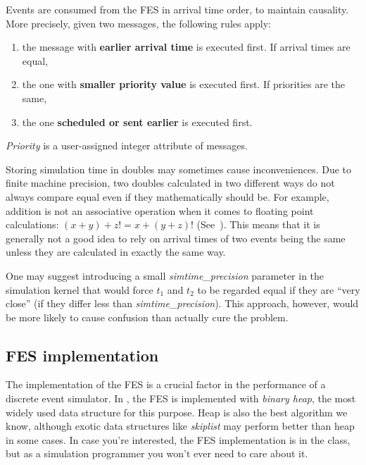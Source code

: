 Events are consumed from the FES in arrival time order, to
maintain causality. More precisely, given two messages, the following
rules apply:
\begin{enumerate}
\item{the message with \textbf{earlier arrival time} is executed
    first.  If arrival times are equal,}
\item{the one with \textbf{smaller priority value} is executed first.
    If priorities are the same,}
\item{the one \textbf{scheduled or sent earlier} is executed first.}
\end{enumerate}

\textit{Priority} is a user-assigned integer
attribute of messages.

Storing simulation time in doubles may sometimes cause inconveniences.
Due to finite machine precision, two doubles calculated in two
different ways do not always compare equal even if they mathematically
should be. For example, addition is not an associative operation
when it comes to floating point calculations: $(x+y)+z != x+(y+z)$!
(See~\cite{Goldberg91what}).
This means that it is generally not a good idea to rely on
arrival times of two events being the same unless they are
calculated in exactly the same way.

One may suggest introducing a small \textit{simtime\_precision} parameter in
the simulation kernel that would force $t_{1}$ and $t_{2}$ to be regarded
equal if they are ``very close'' (if they differ
less than \textit{simtime\_precision}). This approach, however, would
be more likely to cause confusion than actually cure the problem.



\subsection{FES implementation}

The implementation of the FES is a crucial factor in the
performance of a discrete event simulator. In {\opp}, the FES is
implemented with \textit{binary heap}, the most
widely used data structure for this purpose. Heap is also the best
algorithm we know, although exotic data structures like
\textit{skiplist} may perform better than heap in some
cases. In case you're interested, the FES implementation is in the
 class, but as a simulation programmer you won't
ever need to care about it.





